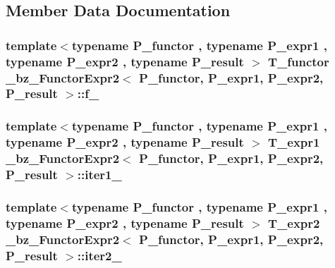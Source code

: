 \subsection{Member Data Documentation}
\hypertarget{class__bz__FunctorExpr2_aadc2647a043631e9cc665eda01716651}{}
\subsubsection[{f\+\_\+}]{\setlength{\rightskip}{0pt plus 5cm}template$<$typename P\+\_\+functor , typename P\+\_\+expr1 , typename P\+\_\+expr2 , typename P\+\_\+result $>$ {\bf T\+\_\+functor} {\bf \+\_\+bz\+\_\+\+Functor\+Expr2}$<$ P\+\_\+functor, P\+\_\+expr1, P\+\_\+expr2, P\+\_\+result $>$\+::f\+\_\+\hspace{0.3cm}{\ttfamily [protected]}}\label{class__bz__FunctorExpr2_aadc2647a043631e9cc665eda01716651}
\hypertarget{class__bz__FunctorExpr2_aa20ecd4ec9e978c65911a9727f1ca963}{}
\subsubsection[{iter1\+\_\+}]{\setlength{\rightskip}{0pt plus 5cm}template$<$typename P\+\_\+functor , typename P\+\_\+expr1 , typename P\+\_\+expr2 , typename P\+\_\+result $>$ {\bf T\+\_\+expr1} {\bf \+\_\+bz\+\_\+\+Functor\+Expr2}$<$ P\+\_\+functor, P\+\_\+expr1, P\+\_\+expr2, P\+\_\+result $>$\+::iter1\+\_\+\hspace{0.3cm}{\ttfamily [protected]}}\label{class__bz__FunctorExpr2_aa20ecd4ec9e978c65911a9727f1ca963}
\hypertarget{class__bz__FunctorExpr2_a1dbd4eaa6ff6ccf9bc00fb6d1634a15b}{}
\subsubsection[{iter2\+\_\+}]{\setlength{\rightskip}{0pt plus 5cm}template$<$typename P\+\_\+functor , typename P\+\_\+expr1 , typename P\+\_\+expr2 , typename P\+\_\+result $>$ {\bf T\+\_\+expr2} {\bf \+\_\+bz\+\_\+\+Functor\+Expr2}$<$ P\+\_\+functor, P\+\_\+expr1, P\+\_\+expr2, P\+\_\+result $>$\+::iter2\+\_\+\hspace{0.3cm}{\ttfamily [protected]}}\label{class__bz__FunctorExpr2_a1dbd4eaa6ff6ccf9bc00fb6d1634a15b}
\hypertarget{class__bz__FunctorExpr2_a6aa783855d43f08337c2383a52a73f91}{}
